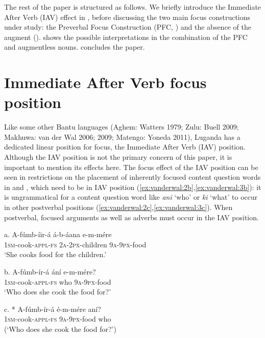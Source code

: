 \documentclass[output=paper]{langsci/langscibook}
\begin{document}
The rest of the paper is structured as follows. We briefly introduce the Immediate After Verb (IAV) effect in , before discussing the two main focus constructions under study: the Preverbal Focus Construction (PFC, ) and the absence of the augment ().  shows the possible interpretations in the combination of the PFC and augmentless nouns.  concludes the paper.

 \section{Immediate After Verb focus position}

Like some other Bantu languages (Aghem: Watters 1979; Zulu: Buell 2009; Makhuwa: van der Wal 2006; 2009; Matengo: Yoneda 2011), Luganda has a dedicated linear position for focus, the Immediate After Verb (IAV) position. Although the IAV position is not the primary concern of this paper, it is important to mention its effects here. The focus effect of the IAV position can be seen in restrictions on the placement of inherently focused content question words in  and , which need to be in IAV position (\ref{ex:vanderwal:2b},\ref{ex:vanderwal:3b}): it is ungrammatical for a content question word like \textit{ani} ‘who’ or \textit{ki} ‘what’ to occur in other postverbal positions (\ref{ex:vanderwal:2c},\ref{ex:vanderwal:3c}). When postverbal, focused arguments as well as adverbs must occur in the IAV position.

\ea
\gll a.  A-fúmb-íir-á    á-b-áana    e-m-mére\\
       \textsc{1sm}-cook-\textsc{appl}-\textsc{fs}  \textsc{2a}-\textsc{2px}-children  \textsc{9a}-\textsc{9px}-food\\
\glt   ‘She cooks food for the children.’
\z

\ea
\gll b.  A-fúmb-ír-á    ání  e-m-mére?\\
       \textsc{1sm}-cook-\textsc{appl}-\textsc{fs}  who  \textsc{9a}-\textsc{9px}-food\\
\glt   ‘Who does she cook the food for?’
\z

\ea
\gll c.  * A-fúmb-ír-á  é-m-mére   aní?\\
       \textsc{1sm}-cook-\textsc{appl}-\textsc{fs}  \textsc{9a-9px}-food  who\\
\glt   (‘Who does she cook the food for?’)
\z
\end{document}
